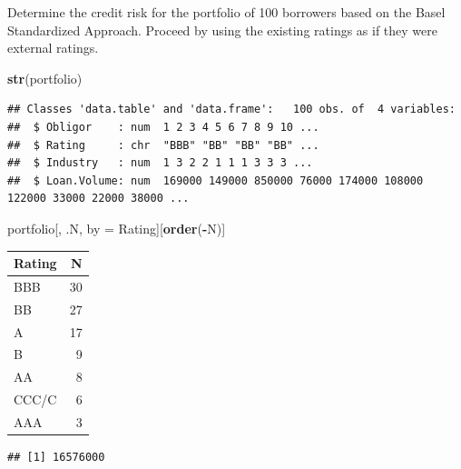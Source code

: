 \documentclass[
  11pt,
]{article}
\newenvironment{Shaded}{\begin{snugshade}}{\end{snugshade}}
\newcommand{\FunctionTok}[1]{\textcolor[rgb]{0.13,0.29,0.53}{\textbf{#1}}}
\newcommand{\NormalTok}[1]{#1}
\newcommand{\OtherTok}[1]{\textcolor[rgb]{0.56,0.35,0.01}{#1}}
\newcommand{\SpecialCharTok}[1]{\textcolor[rgb]{0.81,0.36,0.00}{\textbf{#1}}}
\newcounter{none} %
\begin{document}
Determine the credit risk for the portfolio of 100 borrowers based on
the Basel Standardized Approach. Proceed by using the existing ratings
as if they were external ratings.

\begin{Shaded}
\begin{Highlighting}[]
\FunctionTok{str}\NormalTok{(portfolio)}
\end{Highlighting}
\end{Shaded}

\begin{verbatim}
## Classes 'data.table' and 'data.frame':   100 obs. of  4 variables:
##  $ Obligor    : num  1 2 3 4 5 6 7 8 9 10 ...
##  $ Rating     : chr  "BBB" "BB" "BB" "BB" ...
##  $ Industry   : num  1 3 2 2 1 1 1 3 3 3 ...
##  $ Loan.Volume: num  169000 149000 850000 76000 174000 108000 122000 33000 22000 38000 ...
\end{verbatim}

\begin{Shaded}
\begin{Highlighting}[]
\NormalTok{portfolio[, .N, by }\OtherTok{=}\NormalTok{ Rating][}\FunctionTok{order}\NormalTok{(}\SpecialCharTok{{-}}\NormalTok{N)]}
\end{Highlighting}
\end{Shaded}

{\def\LTcaptype{none} %
\begin{longtable}[]{@{}lr@{}}
\toprule\noalign{}
Rating & N \\
\midrule\noalign{}
\endhead
\bottomrule\noalign{}
\endlastfoot
BBB & 30 \\
BB & 27 \\
A & 17 \\
B & 9 \\
AA & 8 \\
CCC/C & 6 \\
AAA & 3 \\
\end{longtable}
}

\begin{Shaded}
\end{Shaded}

\begin{verbatim}
## [1] 16576000
\end{verbatim}
\end{document}
